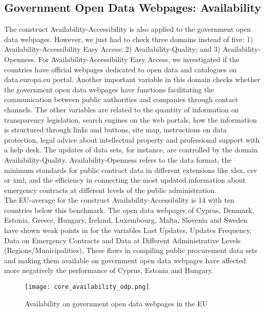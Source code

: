 \documentclass[a4paper, twoside]{report}
\begin{document}
\subsection{Government Open Data Webpages: Availability}

The construct Availability-Accessibility is also applied to the government open data webpages. However, we just had to check three domains instead of five: 1) Availability-Accessibility Easy Access; 2) Availability-Quality; and 3) Availability-Openness. For Availability-Accessibility Easy Access, we investigated if the countries have official webpages dedicated to open data and catalogues on data.europa.eu portal. Another important variable in this domain checks whether the government open data webpages have functions facilitating the communication between public authorities and companies through contact channels. The other variables are related to the quantity of information on transparency legislation, search engines on the web portals, how the information is structured through links and buttons, site map, instructions on data protection, legal advice about intellectual property and professional support with a help desk. The updates of data sets, for instance, are controlled by the domain Availability-Quality. Availability-Openness refers to the data format, the minimum standards for public contract data in different extensions like xlsx, csv or xml, and the efficiency in connecting the most updated information about emergency contracts at different levels of the public administration.\\  

The EU-average for the construct Availability-Accessibility is 14 with ten countries below this benchmark. The open data webpages of Cyprus, Denmark, Estonia, Greece, Hungary, Ireland, Luxembourg, Malta, Slovenia and Sweden have shown weak points in for the variables Last Updates, Updates Frequency, Data on Emergency Contracts and Data at Different Administrative Levels (Regions/Municipalities), These flaws in compiling public procurement data sets and making them available on government open data webpages have affected more negatively the performance of Cyprus, Estonia and Hungary.\\ 

\begin{figure}[H]
\centering
	\caption{Availability on government open data webpages in the EU}
	\texttt{[image: core\_availability\_odp.png]}
	\label{fig:core_availability_odp}
\end{figure}
\end{document}
